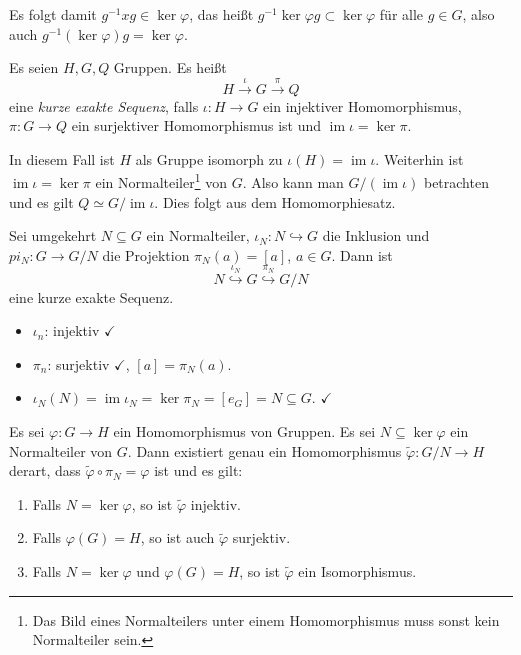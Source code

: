 Es folgt damit $g^{-1} x g \in \ker \varphi$, das heißt $g^{-1} \ker \varphi g \subset \ker \varphi$ für alle $g \in G$, also auch $g^{-1} ( \ker \varphi ) g = \ker \varphi$. 

Es seien $H, G, Q$ Gruppen. Es heißt
\[ H \xrightarrow{\iota} G \xrightarrow{\pi} Q \]
eine \emph{kurze exakte Sequenz}, falls $\iota: H \to G$ ein injektiver Homomorphismus, $\pi: G \to Q$ ein surjektiver Homomorphismus ist und $\operatorname{im} \iota = \ker \pi$.

In diesem Fall ist $H$ als Gruppe isomorph zu $\iota(H) = \operatorname{im} \iota$. Weiterhin ist $\operatorname{im} \iota = \ker \pi $ ein Normalteiler\footnote{Das Bild eines Normalteilers unter einem Homomorphismus muss sonst kein Normalteiler sein.} von $G$. Also kann man $G / (\operatorname{im} \iota)$ betrachten und es gilt $Q \simeq G / \operatorname{im} \iota$. Dies folgt aus dem Homomorphiesatz.

Sei umgekehrt $N \subseteq G$ ein Normalteiler, $\iota_N: N \hookrightarrow G$ die Inklusion und $pi_N: G \to G/N$ die Projektion $\pi_N(a) = [a]$, $a \in G$. Dann ist
\[ N \overset{\iota_N}{\hookrightarrow} G \overset{\pi_N}{\hookrightarrow} G / N \]
eine kurze exakte Sequenz.
\begin{itemize}
 \item $\iota_n$: injektiv $\checkmark$
 \item $\pi_n$: surjektiv $\checkmark$, $[a] = \pi_N(a)$.
 \item $\iota_N(N) = \operatorname{im} \iota_N = \ker \pi_N = [e_G] = N \subseteq G.$ $\checkmark$
\end{itemize}

\begin{thm*}
 Es sei $\varphi: G \to H$ ein Homomorphismus von Gruppen. Es sei $N \subseteq \ker \varphi$ ein Normalteiler von $G$. Dann existiert genau ein Homomorphismus $\tilde{\varphi}: G/N \to H$ derart, dass $\tilde{\varphi} \circ \pi_N = \varphi$ ist und es gilt: 
 \begin{enumerate}
  \item Falls $N = \ker \varphi$, so ist $\tilde{\varphi}$ injektiv.
  \item Falls $\varphi(G) = H$, so ist auch $\tilde{\varphi}$ surjektiv.
  \item Falls $N = \ker \varphi$ und $\varphi(G) = H$, so ist $\tilde{\varphi}$ ein Isomorphismus.
 \end{enumerate}
\end{thm*}

